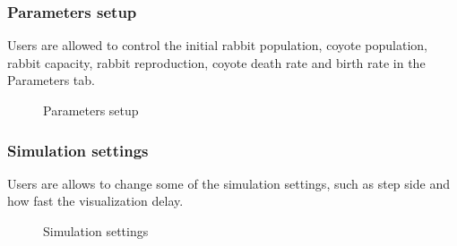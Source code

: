 \documentclass{article}
\begin{document}
\begin{normalsize}
\subsubsection{Parameters setup}
Users are allowed to control the initial rabbit population, coyote population, rabbit capacity, rabbit reproduction, coyote death rate and birth rate in the Parameters tab.
\begin{figure}[H]
	\caption{Parameters setup}
\end{figure}

\subsubsection{Simulation settings}
Users are allows to change some of the simulation settings, such as step side and how fast the visualization delay.
\begin{figure}[H]
	\caption{Simulation settings}
\end{figure}


\end{normalsize}
\end{document}
